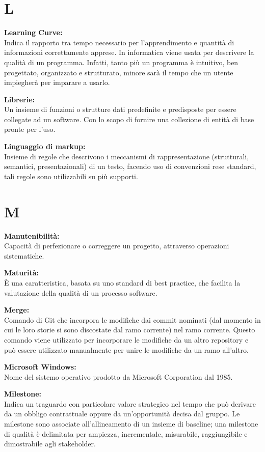 \documentclass[a4paper, oneside, openany, dvipsnames, table]{article}
\begin{document}
\newpage
\section{L}
\textbf{Learning Curve:}\\	Indica il rapporto tra tempo necessario per l'apprendimento e quantità di informazioni correttamente apprese. In informatica viene usata per descrivere la qualità di un programma. Infatti, tanto più un programma è intuitivo, ben progettato, organizzato e strutturato, minore sarà il tempo che un utente impiegherà per imparare a usarlo. 

\textbf{Librerie:}\\	Un insieme di funzioni o strutture dati predefinite e predisposte per essere collegate ad un software. Con lo scopo di fornire una collezione di entità di base pronte per l'uso.

\textbf{Linguaggio di markup:}\\  Insieme di regole che descrivono i meccanismi di rappresentazione (strutturali, semantici, presentazionali) di un testo, facendo uso di convenzioni rese standard, tali regole sono utilizzabili su più supporti.

\newpage
\section{M}
\textbf{Manutenibilità:}\\ Capacità di perfezionare o correggere un progetto, attraverso operazioni sistematiche.

\textbf{Maturità:}\\ \`E una caratteristica, basata su uno standard di best practice, che facilita la valutazione della qualità di un processo software. 

\textbf{Merge:}\\	Comando di Git che incorpora le modifiche dai commit nominati (dal momento in cui le loro storie si sono discostate dal ramo corrente) nel ramo corrente. Questo comando viene utilizzato per incorporare le modifiche da un altro repository e può essere utilizzato manualmente per unire le modifiche da un ramo all'altro.

\textbf{Microsoft Windows:}\\	Nome del sistemo operativo prodotto da Microsoft Corporation dal 1985.

\textbf{Milestone:}\\	Indica un traguardo con particolare valore strategico nel tempo che può derivare da un obbligo contrattuale oppure da un'opportunità decisa dal gruppo. Le milestone sono associate all'allineamento di un insieme di baseline; una milestone di qualità è delimitata per ampiezza, incrementale, misurabile, raggiungibile e dimostrabile agli stakeholder.
\end{document}
